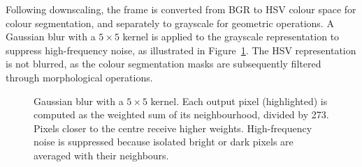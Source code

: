 Following downscaling, the frame is converted from BGR to HSV colour space for
colour segmentation, and separately to grayscale for geometric operations. A
Gaussian blur with a $5 \times 5$ kernel is applied to the grayscale
representation to suppress high-frequency noise, as illustrated in
Figure~\ref{fig:gaussian_blur}. The HSV representation is not blurred, as the
colour segmentation masks are subsequently filtered through morphological
operations.

\begin{figure}[h]
\centering
{}
\caption[Gaussian blur with a $5 \times 5$ kernel.]{Gaussian blur with a $5\times5$
kernel. Each output pixel (highlighted) is computed as the weighted sum of its
neighbourhood, divided by 273. Pixels closer to the centre receive higher weights.
High-frequency noise is suppressed because isolated bright or dark pixels are
averaged with their neighbours.}
\label{fig:gaussian_blur}
\end{figure}